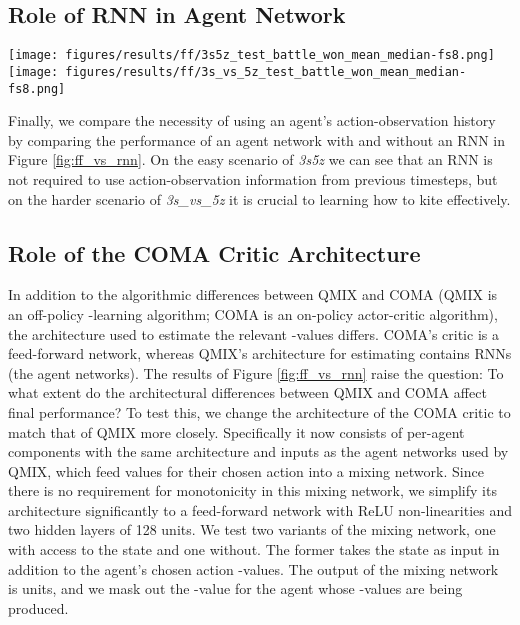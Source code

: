 \documentclass[twoside,11pt]{article}
\begin{document}
\subsection{Role of RNN in Agent Network}

\begin{figure*}[h!]
    \centering
    \texttt{[image: figures/results/ff/3s5z\_test\_battle\_won\_mean\_median-fs8.png]}
    \texttt{[image: figures/results/ff/3s\_vs\_5z\_test\_battle\_won\_mean\_median-fs8.png]}
    \caption{Comparing agent networks with and without RNNs (QMIX-FF) on two scenarios.}
    \label{fig:ff_vs_rnn}
\end{figure*}

Finally, we compare the necessity of using an agent's action-observation history by comparing the performance of an agent network with and without an RNN in Figure \ref{fig:ff_vs_rnn}.
On the easy scenario of \textit{3s5z} we can see that an RNN is not required to use action-observation information from previous timesteps, but on the harder scenario of \textit{3s\_vs\_5z} it is crucial to learning how to kite effectively. 

\subsection{Role of the COMA Critic Architecture}

In addition to the algorithmic differences between QMIX and COMA (QMIX is an off-policy -learning algorithm; COMA is an on-policy actor-critic algorithm), the architecture used to estimate the relevant -values differs.
COMA's critic is a feed-forward network, whereas QMIX's architecture for estimating  contains RNNs (the agent networks).
The results of Figure \ref{fig:ff_vs_rnn} raise the question: To what extent do the architectural differences between QMIX and COMA affect final performance?
To test this, we change the architecture of the COMA critic to match that of QMIX more closely.
Specifically it now consists of per-agent components with the same architecture and inputs as the agent networks used by QMIX, which feed   values for their chosen action into a mixing network. 
Since there is no requirement for monotonicity in this mixing network, we simplify its architecture significantly to a feed-forward network with ReLU non-linearities and two hidden layers of 128 units.
We test two variants of the mixing network, one with access to the state and one without.
The former takes the state as input in addition to the agent's chosen action -values.
The output of the mixing network is  units, and we mask out the -value for the agent whose -values are being produced.
\end{document}
